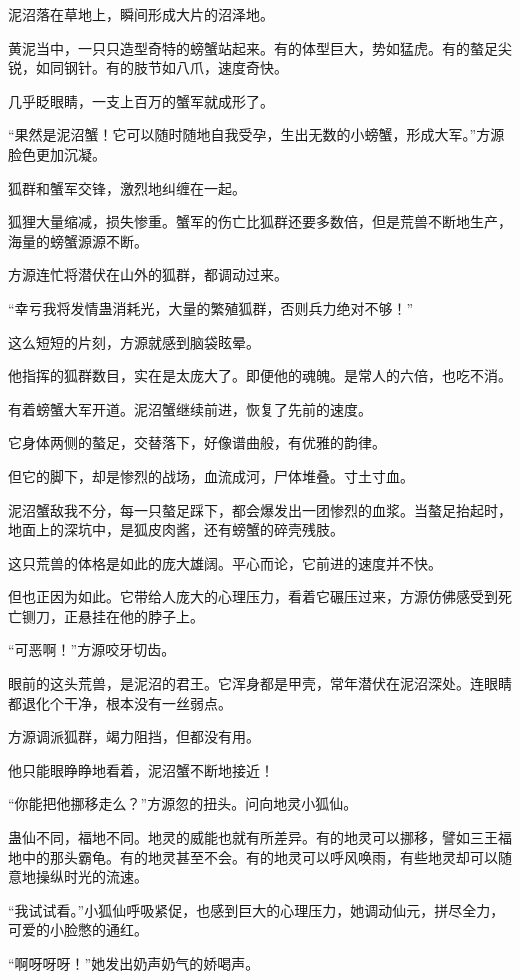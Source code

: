 \begin{this_body}
泥沼落在草地上，瞬间形成大片的沼泽地。

黄泥当中，一只只造型奇特的螃蟹站起来。有的体型巨大，势如猛虎。有的螯足尖锐，如同钢针。有的肢节如八爪，速度奇快。

几乎眨眼睛，一支上百万的蟹军就成形了。

“果然是泥沼蟹！它可以随时随地自我受孕，生出无数的小螃蟹，形成大军。”方源脸色更加沉凝。

狐群和蟹军交锋，激烈地纠缠在一起。

狐狸大量缩减，损失惨重。蟹军的伤亡比狐群还要多数倍，但是荒兽不断地生产，海量的螃蟹源源不断。

方源连忙将潜伏在山外的狐群，都调动过来。

“幸亏我将发情蛊消耗光，大量的繁殖狐群，否则兵力绝对不够！”

这么短短的片刻，方源就感到脑袋眩晕。

他指挥的狐群数目，实在是太庞大了。即便他的魂魄。是常人的六倍，也吃不消。

有着螃蟹大军开道。泥沼蟹继续前进，恢复了先前的速度。

它身体两侧的螯足，交替落下，好像谱曲般，有优雅的韵律。

但它的脚下，却是惨烈的战场，血流成河，尸体堆叠。寸土寸血。

泥沼蟹敌我不分，每一只螯足踩下，都会爆发出一团惨烈的血浆。当螯足抬起时，地面上的深坑中，是狐皮肉酱，还有螃蟹的碎壳残肢。

这只荒兽的体格是如此的庞大雄阔。平心而论，它前进的速度并不快。

但也正因为如此。它带给人庞大的心理压力，看着它碾压过来，方源仿佛感受到死亡铡刀，正悬挂在他的脖子上。

“可恶啊！”方源咬牙切齿。

眼前的这头荒兽，是泥沼的君王。它浑身都是甲壳，常年潜伏在泥沼深处。连眼睛都退化个干净，根本没有一丝弱点。

方源调派狐群，竭力阻挡，但都没有用。

他只能眼睁睁地看着，泥沼蟹不断地接近！

“你能把他挪移走么？”方源忽的扭头。问向地灵小狐仙。

蛊仙不同，福地不同。地灵的威能也就有所差异。有的地灵可以挪移，譬如三王福地中的那头霸龟。有的地灵甚至不会。有的地灵可以呼风唤雨，有些地灵却可以随意地操纵时光的流速。

“我试试看。”小狐仙呼吸紧促，也感到巨大的心理压力，她调动仙元，拼尽全力，可爱的小脸憋的通红。

“啊呀呀呀！”她发出奶声奶气的娇喝声。


\end{this_body}
